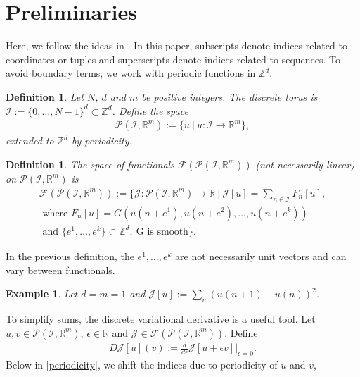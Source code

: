 \documentclass[manuscript]{acmart}
\newcommand{\Rr}{{\mathbb{R}}}
\newcommand{\Zz}{{\mathbb{Z}}}
\newcommand{\1}{{\chi}}
\newcommand{\Ii}{{\mathcal{I}}}
\numberwithin{equation}{section}
\theoremstyle{thmlemcorr}
\numberwithin{theorem}{section}
\theoremstyle{thmlemcorr*}
\theoremstyle{defi}
\newtheorem{definition}[theorem]{Definition}
\theoremstyle{remexample}
\newtheorem{example}[theorem]{Example}
\theoremstyle{ass}
\begin{document}
\section{Preliminaries}
\label{assp}
Here, we follow the ideas in \cite{gomes20}.
In this paper, subscripts denote indices related to coordinates or tuples and superscripts denote indices related to sequences.
To avoid boundary terms, we work with periodic functions in $\Zz^d$.
\begin{definition}
	Let $N$, $d$ and $m$ be positive integers. The \emph{discrete torus} is $\Ii:=\{0,\ldots,N-1\}^d\subset \Zz^d$. Define the space
	\begin{gather*}
		\mathcal{P}(\Ii,\Rr^m):=\{u\ |\ u:\Ii\rightarrow\Rr^m\},
	\end{gather*}
	extended to $\Zz^d$ by periodicity.
\end{definition}
\begin{definition}
	The space of functionals $\mathcal{F}(\mathcal{P}(\Ii,\Rr^m))$ (not necessarily linear) on $\mathcal{P}(\Ii,\Rr^m)$ is
\begin{gather*}
	\mathcal{F}(\mathcal{P}(\Ii,\Rr^m)):= \Bigg\{\mathcal{J}:\mathcal{P}(\Ii,\Rr^m)\to \Rr\ \Bigg|\ \mathcal{J}[u]=\sum_{n\in\Ii}F_n[u],\\
	\text{ where }
	F_n[u]=G(u(n+e^1),u(n+e^2),\ldots,u(n+e^k))\\
	\text{ and }\{e^1,\ldots,e^k\}\subset\Zz^d,\ \text{G is smooth}
		\Bigg\}.
\end{gather*}
\end{definition}
In the previous definition, the $e^1,\ldots,e^k$ are not necessarily unit vectors and can vary between functionals.
\begin{example}
	\label{functional1}
	Let $d=m=1$ and
	$	\mathcal{J}[u]:=\sum_{n}(u(n+1)-u(n))^2$.
\end{example}
To simplify sums, the discrete variational derivative is a useful tool.
Let $u,v\in\mathcal{P}(\Ii,\Rr^m)$, $\epsilon 
	\in\Rr$ and $\mathcal{J}\in\mathcal{F}(\mathcal{P}(\Ii,\Rr^m))$. Define
	\begin{gather*}
		D\mathcal{J}[u](v):=\frac{d}{d\epsilon}\mathcal{J}[u+\epsilon v]\bigg|_{\epsilon=0}.
	\end{gather*}
	Below in \eqref{periodicity}, we shift the indices due to periodicity of $u$ and $v$,
\end{document}
